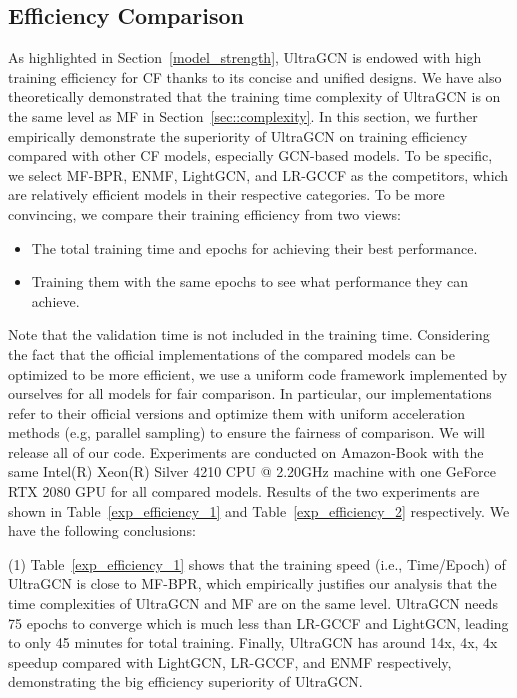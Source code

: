 \documentclass[sigconf,authorversion]{acmart}
\begin{document}
\subsection{Efficiency Comparison}
\label{efficiency_comparison}
As highlighted in Section~\ref{model_strength}, UltraGCN is endowed with high training efficiency for CF thanks to its concise and unified designs. We have also theoretically demonstrated that the training time complexity of UltraGCN is on the same level as MF in Section~\ref{sec::complexity}. In this section, we further empirically demonstrate the superiority of UltraGCN on training efficiency compared with other CF models, especially GCN-based models.
To be specific, we select MF-BPR, ENMF, LightGCN, and LR-GCCF as the competitors, which are relatively efficient models in their respective categories. To be more convincing, we compare their training efficiency from two views:
\begin{itemize}
	\item The total training time and epochs for achieving their best performance.
	\item Training them with the same epochs to see what performance they can achieve.
\end{itemize}
Note that the validation time is not included in the training time. Considering the fact that the official implementations of the compared models can be optimized to be more efficient, we use a uniform code framework implemented by ourselves for all models for fair comparison. 
In particular, our implementations refer to their official versions and optimize them with uniform acceleration methods (e.g, parallel sampling) to ensure the fairness of comparison. We will release all of our code.
Experiments are conducted on Amazon-Book with the same Intel(R) Xeon(R) Silver 4210 CPU @ 2.20GHz machine with one GeForce RTX 2080 GPU for all compared models. Results of the two experiments are shown in Table~\ref{exp_efficiency_1} and Table~\ref{exp_efficiency_2} respectively. We have the following conclusions:

(1) Table~\ref{exp_efficiency_1} shows that the training speed (i.e., Time/Epoch) of UltraGCN is close to MF-BPR, which empirically justifies our analysis that the time complexities of UltraGCN and MF are on the same level. UltraGCN needs 75 epochs to converge which is much less than LR-GCCF and LightGCN, leading to only 45 minutes for total training. Finally, UltraGCN has around 14x, 4x, 4x speedup compared with LightGCN, LR-GCCF, and ENMF respectively, demonstrating the big efficiency superiority of UltraGCN.
\end{document}
